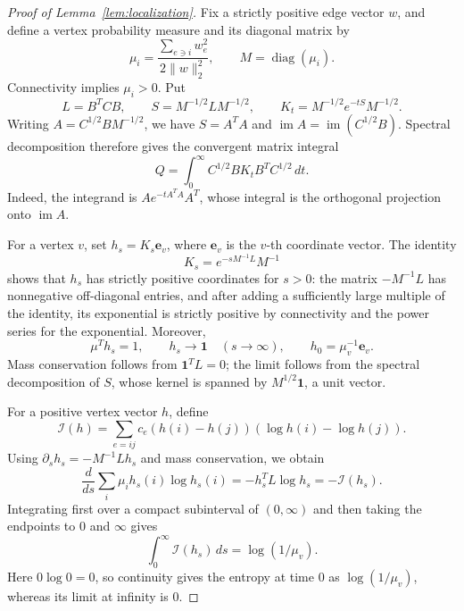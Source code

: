 \documentclass[11pt]{article}
\theoremstyle{remark}
\numberwithin{equation}{section}
\begin{document}
\begin{proof}[Proof of Lemma~\ref{lem:localization}]
Fix a strictly positive edge vector $w$, and define a vertex probability
measure and its diagonal matrix by
\[
  \mu_i=\frac{\sum_{e\ni i}w_e^2}{2\|w\|_2^2},
  \qquad M=\operatorname{diag}(\mu_i).
\]
Connectivity implies $\mu_i>0$. Put
\[
  L=B^TCB,\qquad S=M^{-1/2}LM^{-1/2},\qquad
  K_t=M^{-1/2}e^{-tS}M^{-1/2}.
\]
Writing $A=C^{1/2}BM^{-1/2}$, we have $S=A^TA$ and
$\operatorname{im}A=\operatorname{im}(C^{1/2}B)$. Spectral decomposition
therefore gives the convergent matrix integral
\begin{equation}\label{eq:projection-heat-integral}
 Q=\int_0^\infty C^{1/2}BK_tB^TC^{1/2}\,dt.
\end{equation}
Indeed, the integrand is $Ae^{-tA^TA}A^T$, whose integral is the
orthogonal projection onto $\operatorname{im}A$.

For a vertex $v$, set $h_s=K_s\mathbf e_v$, where $\mathbf e_v$ is the
$v$-th coordinate vector. The identity
\[
 K_s=e^{-sM^{-1}L}M^{-1}
\]
shows that $h_s$ has strictly positive coordinates for $s>0$:
the matrix $-M^{-1}L$ has nonnegative off-diagonal entries, and after
adding a sufficiently large multiple of the identity, its exponential
is strictly positive by connectivity and the power series for the
exponential. Moreover,
\[
 \mu^Th_s=1,\qquad
 h_s\longrightarrow\mathbf 1\quad(s\to\infty),\qquad
 h_0=\mu_v^{-1}\mathbf e_v.
\]
Mass conservation follows from $\mathbf 1^TL=0$; the limit follows
from the spectral decomposition of $S$, whose kernel is spanned by
$M^{1/2}\mathbf 1$, a unit vector.

For a positive vertex vector $h$, define
\[
 \mathcal I(h)=\sum_{e=ij}c_e(h(i)-h(j))
                    (\log h(i)-\log h(j)).
\]
Using $\partial_sh_s=-M^{-1}Lh_s$ and mass conservation, we obtain
\[
 \frac{d}{ds}\sum_i\mu_i h_s(i)\log h_s(i)
   =-h_s^TL\log h_s=-\mathcal I(h_s).
\]
Integrating first over a compact subinterval of $(0,\infty)$ and then
taking the endpoints to $0$ and $\infty$ gives
\begin{equation}\label{eq:heat-entropy}
 \int_0^\infty\mathcal I(h_s)\,ds=\log(1/\mu_v).
\end{equation}
Here $0\log0=0$, so continuity gives the entropy at time $0$ as
$\log(1/\mu_v)$, whereas its limit at infinity is $0$.


\end{proof}
\end{document}
